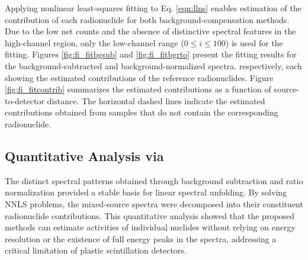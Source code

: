 \documentclass[10pt]{wlscirep}
\begin{document}
Applying nonlinear least-squares fitting to Eq. \eqref{eqn:llns} enables estimation of the contribution of each radionuclide for both background-compensation methods. Due to the low net counts and the absence of distinctive spectral features in the high-channel region, only the low-channel range ($0\le i \le 100$) is used for the fitting. Figures \ref{fig:fi_fitbgsub} and \ref{fig:fi_fitbgrto} present the fitting results for the background-subtracted and background-normalized spectra. respectively, each showing the estimated contributions of the reference radionuclides. Figure \ref{fig:fi_fitcontrib} summarizes the estimated contributions as a function of source-to-detector distance. The horizontal dashed lines indicate the estimated contributions obtained from samples that do not contain the corresponding radionuclide.

 

\subsection*{Quantitative Analysis via}

The distinct spectral patterns obtained through background subtraction and ratio normalization provided a stable basis for linear spectral unfolding. By solving NNLS problems, the mixed-source spectra were decomposed into their constituent radionuclide contributions. This quantitative analysis showed that the proposed methods can estimate activities of individual nuclides without relying on energy resolution or the existence of full energy peaks in the spectra, addressing a critical limitation of plastic scintillation detectors.


\end{document}

